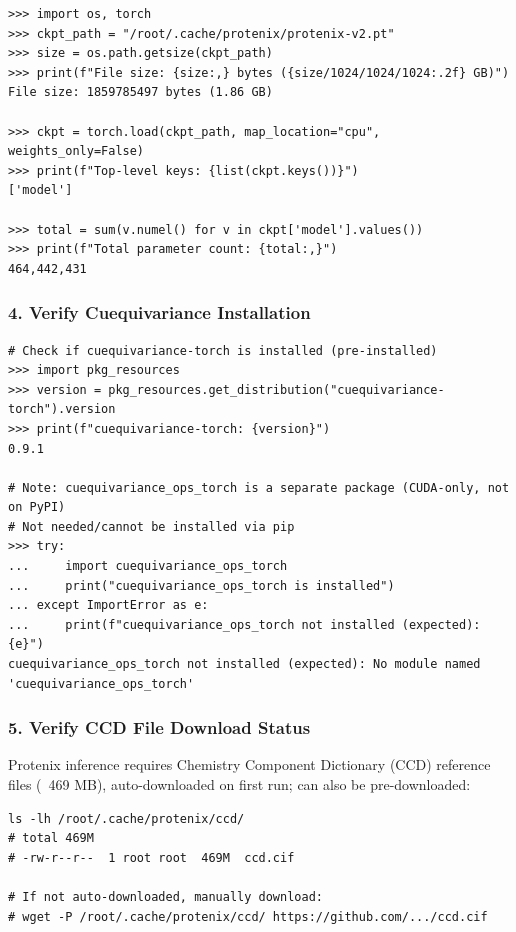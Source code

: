 \documentclass[12pt,a4paper]{article}
\begin{document}
\begin{verbatim}
>>> import os, torch
>>> ckpt_path = "/root/.cache/protenix/protenix-v2.pt"
>>> size = os.path.getsize(ckpt_path)
>>> print(f"File size: {size:,} bytes ({size/1024/1024/1024:.2f} GB)")
File size: 1859785497 bytes (1.86 GB)

>>> ckpt = torch.load(ckpt_path, map_location="cpu", weights_only=False)
>>> print(f"Top-level keys: {list(ckpt.keys())}")
['model']

>>> total = sum(v.numel() for v in ckpt['model'].values())
>>> print(f"Total parameter count: {total:,}")
464,442,431
\end{verbatim}

\subsubsection{4. Verify Cuequivariance Installation}

\begin{verbatim}
# Check if cuequivariance-torch is installed (pre-installed)
>>> import pkg_resources
>>> version = pkg_resources.get_distribution("cuequivariance-torch").version
>>> print(f"cuequivariance-torch: {version}")
0.9.1

# Note: cuequivariance_ops_torch is a separate package (CUDA-only, not on PyPI)
# Not needed/cannot be installed via pip
>>> try:
...     import cuequivariance_ops_torch
...     print("cuequivariance_ops_torch is installed")
... except ImportError as e:
...     print(f"cuequivariance_ops_torch not installed (expected): {e}")
cuequivariance_ops_torch not installed (expected): No module named 'cuequivariance_ops_torch'
\end{verbatim}

\subsubsection{5. Verify CCD File Download Status}

Protenix inference requires Chemistry Component Dictionary (CCD) reference files (~469 MB), auto-downloaded on first run; can also be pre-downloaded:

\begin{verbatim}
ls -lh /root/.cache/protenix/ccd/
# total 469M
# -rw-r--r--  1 root root  469M  ccd.cif

# If not auto-downloaded, manually download:
# wget -P /root/.cache/protenix/ccd/ https://github.com/.../ccd.cif
\end{verbatim}
\end{document}
